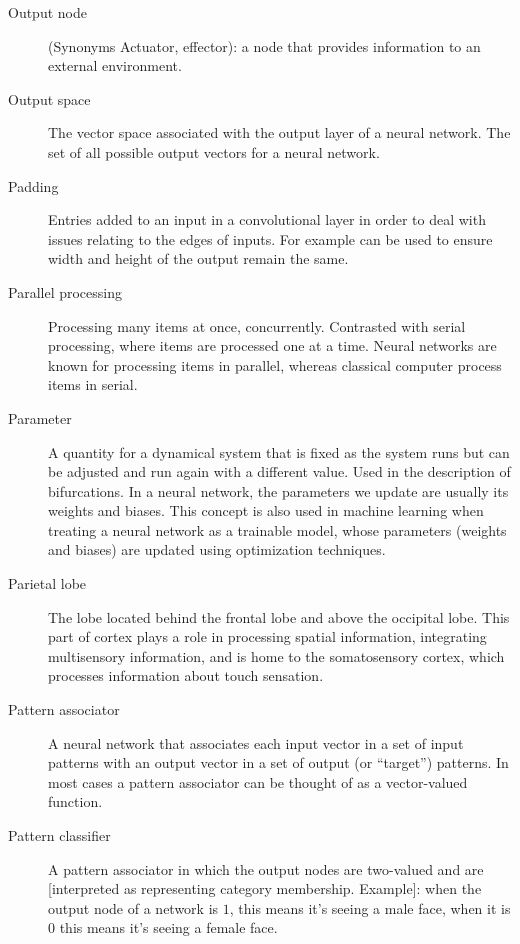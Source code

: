 \begin{description}
\item[Output node] (Synonyms Actuator, effector): a node that provides information to an external environment. 

\item[Output space] The vector space associated with the output layer of a neural network. The set of all possible output vectors for a neural network.

\item[Padding] Entries added to an input in a convolutional layer in order to deal with issues relating to the edges of inputs. For example can be used to ensure width and height of the output remain the same.

\item[Parallel processing] Processing many items at once, concurrently. Contrasted with serial processing, where items are processed one at a time.  Neural networks are known for processing items in parallel, whereas classical computer process items in serial.

\item[Parameter] A quantity for a dynamical system that is fixed as the system runs but can be adjusted and run again with a different value. Used in the description of bifurcations. In a neural network, the parameters we  update are usually its weights and biases. This concept is also used in machine learning when treating a neural network as a trainable model, whose parameters (weights and biases) are updated using optimization techniques.

\item[Parietal lobe] The lobe located behind the frontal lobe and above the occipital lobe. This part of cortex plays a role in processing spatial information, integrating multisensory information, and is home to the somatosensory cortex, which processes information about touch sensation.

\item[Pattern associator] A neural network that associates each input vector in a set of input patterns with an output vector in a set of output (or ``target'') patterns. In most cases a pattern associator can be thought of as a vector-valued function. 
	

\item[Pattern classifier] A pattern associator in which the output nodes are two-valued and are [interpreted as representing category membership. Example]: when the output node of a network is $1$, this means it's seeing a male face, when it is $0$ this means it's seeing a female face.


\end{description}
